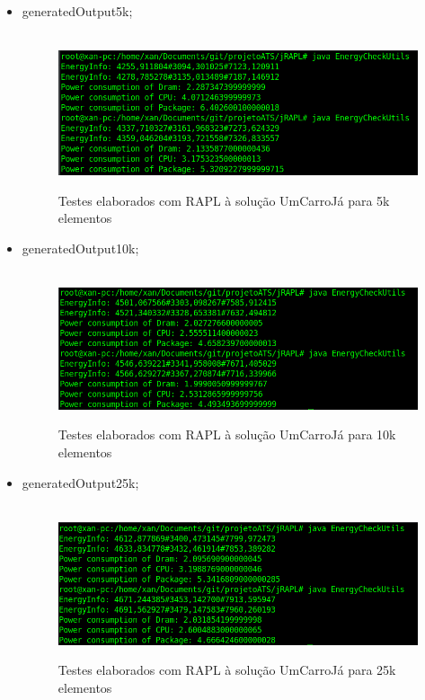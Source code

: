 \begin{itemize}
    \item generatedOutput5k;
    
        \begin{figure}[H]
            \hbox{\hspace{-8em} \includegraphics[width=1.5\textwidth]{images/rapl_5k.png}}
            \label{fig52}
            \caption{Testes elaborados com RAPL à solução UmCarroJá para 5k elementos}
        \end{figure}
   
    \item generatedOutput10k;
    
        \begin{figure}[H]
            \hbox{\hspace{-8em} \includegraphics[width=1.5\textwidth]{images/rapl_10k.png}}
            \label{fig53}
            \caption{Testes elaborados com RAPL à solução UmCarroJá para 10k elementos}
        \end{figure}
        
    \item generatedOutput25k;
    
        \begin{figure}[H]
            \hbox{\hspace{-8em} \includegraphics[width=1.5\textwidth]{images/rapl_25k.png}}
            \label{fig54}
            \caption{Testes elaborados com RAPL à solução UmCarroJá para 25k elementos}
        \end{figure}
        

\end{itemize}
